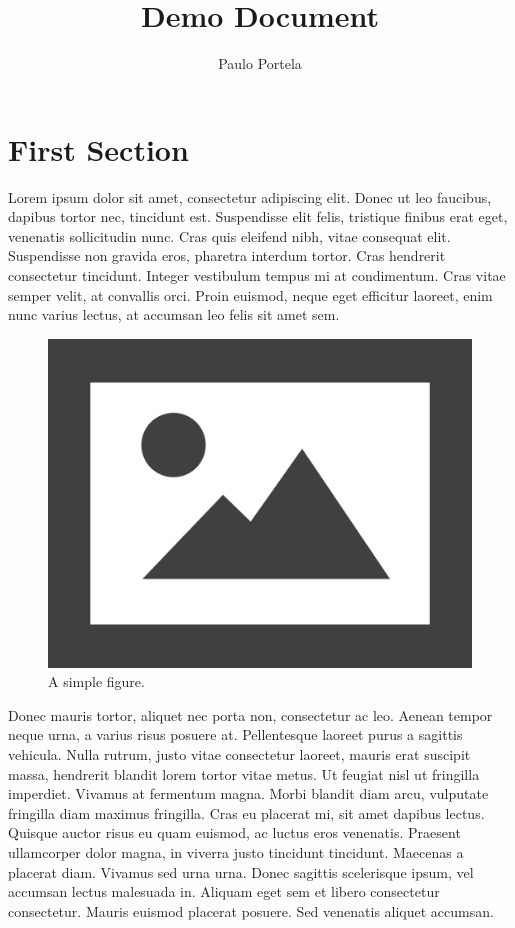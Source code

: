 \documentclass{article}
\begin{document}
	\title{Demo Document}  %
	\author{Paulo Portela}  %
	\maketitle  %
	\thispagestyle{empty}  %
	\newpage
	
	\setcounter{page}{1}  %
	
	\tableofcontents
	\newpage
	
	\listoffigures  %
	\newpage
	
	\setcounter{page}{1}  %
	
	\section{First Section}
	
	Lorem ipsum dolor sit amet, consectetur adipiscing elit. Donec ut leo faucibus, dapibus tortor nec, tincidunt est. Suspendisse elit felis, tristique finibus erat eget, venenatis sollicitudin nunc. Cras quis eleifend nibh, vitae consequat elit. Suspendisse non gravida eros, pharetra interdum tortor. Cras hendrerit consectetur tincidunt. Integer vestibulum tempus mi at condimentum. Cras vitae semper velit, at convallis orci. Proin euismod, neque eget efficitur laoreet, enim nunc varius lectus, at accumsan leo felis sit amet sem.
	
	\begin{figure}[H]
		\centering
		\includegraphics[width=0.3\linewidth]{figures/fig1}
		\caption[Figure 1]{A simple figure.}
		\label{fig:fig1}
	\end{figure}
	
	Donec mauris tortor, aliquet nec porta non, consectetur ac leo. Aenean tempor neque urna, a varius risus posuere at. Pellentesque laoreet purus a sagittis vehicula. Nulla rutrum, justo vitae consectetur laoreet, mauris erat suscipit massa, hendrerit blandit lorem tortor vitae metus. Ut feugiat nisl ut fringilla imperdiet. Vivamus at fermentum magna. Morbi blandit diam arcu, vulputate fringilla diam maximus fringilla. Cras eu placerat mi, sit amet dapibus lectus. Quisque auctor risus eu quam euismod, ac luctus eros venenatis. Praesent ullamcorper dolor magna, in viverra justo tincidunt tincidunt. Maecenas a placerat diam. Vivamus sed urna urna. Donec sagittis scelerisque ipsum, vel accumsan lectus malesuada in. Aliquam eget sem et libero consectetur consectetur. Mauris euismod placerat posuere. Sed venenatis aliquet accumsan.
	
\end{document}
